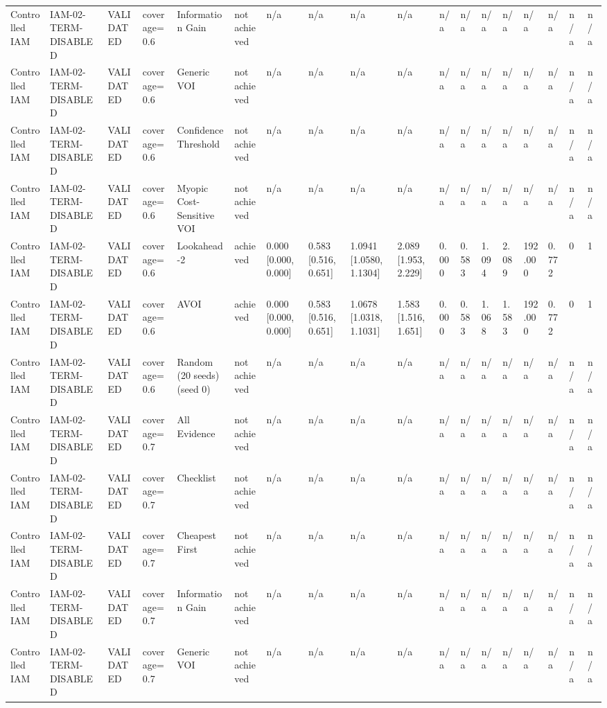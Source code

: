 \begin{table}[!ht]
{\begin{tabular}{llllllllllllllllll}
Controlled IAM & IAM-02-TERM-DISABLED & VALIDATED & coverage=0.6 & Information Gain & not achieved & n/a & n/a & n/a & n/a & n/a & n/a & n/a & n/a & n/a & n/a & n/a & n/a \\
Controlled IAM & IAM-02-TERM-DISABLED & VALIDATED & coverage=0.6 & Generic VOI & not achieved & n/a & n/a & n/a & n/a & n/a & n/a & n/a & n/a & n/a & n/a & n/a & n/a \\
Controlled IAM & IAM-02-TERM-DISABLED & VALIDATED & coverage=0.6 & Confidence Threshold & not achieved & n/a & n/a & n/a & n/a & n/a & n/a & n/a & n/a & n/a & n/a & n/a & n/a \\
Controlled IAM & IAM-02-TERM-DISABLED & VALIDATED & coverage=0.6 & Myopic Cost-Sensitive VOI & not achieved & n/a & n/a & n/a & n/a & n/a & n/a & n/a & n/a & n/a & n/a & n/a & n/a \\
Controlled IAM & IAM-02-TERM-DISABLED & VALIDATED & coverage=0.6 & Lookahead-2 & achieved & 0.000 [0.000, 0.000] & 0.583 [0.516, 0.651] & 1.0941 [1.0580, 1.1304] & 2.089 [1.953, 2.229] & 0.000 & 0.583 & 1.094 & 2.089 & 192.000 & 0.772 & 0 & 1 \\
Controlled IAM & IAM-02-TERM-DISABLED & VALIDATED & coverage=0.6 & AVOI & achieved & 0.000 [0.000, 0.000] & 0.583 [0.516, 0.651] & 1.0678 [1.0318, 1.1031] & 1.583 [1.516, 1.651] & 0.000 & 0.583 & 1.068 & 1.583 & 192.000 & 0.772 & 0 & 1 \\
Controlled IAM & IAM-02-TERM-DISABLED & VALIDATED & coverage=0.6 & Random (20 seeds) (seed 0) & not achieved & n/a & n/a & n/a & n/a & n/a & n/a & n/a & n/a & n/a & n/a & n/a & n/a \\
Controlled IAM & IAM-02-TERM-DISABLED & VALIDATED & coverage=0.7 & All Evidence & not achieved & n/a & n/a & n/a & n/a & n/a & n/a & n/a & n/a & n/a & n/a & n/a & n/a \\
Controlled IAM & IAM-02-TERM-DISABLED & VALIDATED & coverage=0.7 & Checklist & not achieved & n/a & n/a & n/a & n/a & n/a & n/a & n/a & n/a & n/a & n/a & n/a & n/a \\
Controlled IAM & IAM-02-TERM-DISABLED & VALIDATED & coverage=0.7 & Cheapest First & not achieved & n/a & n/a & n/a & n/a & n/a & n/a & n/a & n/a & n/a & n/a & n/a & n/a \\
Controlled IAM & IAM-02-TERM-DISABLED & VALIDATED & coverage=0.7 & Information Gain & not achieved & n/a & n/a & n/a & n/a & n/a & n/a & n/a & n/a & n/a & n/a & n/a & n/a \\
Controlled IAM & IAM-02-TERM-DISABLED & VALIDATED & coverage=0.7 & Generic VOI & not achieved & n/a & n/a & n/a & n/a & n/a & n/a & n/a & n/a & n/a & n/a & n/a & n/a \\

\end{tabular}}
\end{table}
